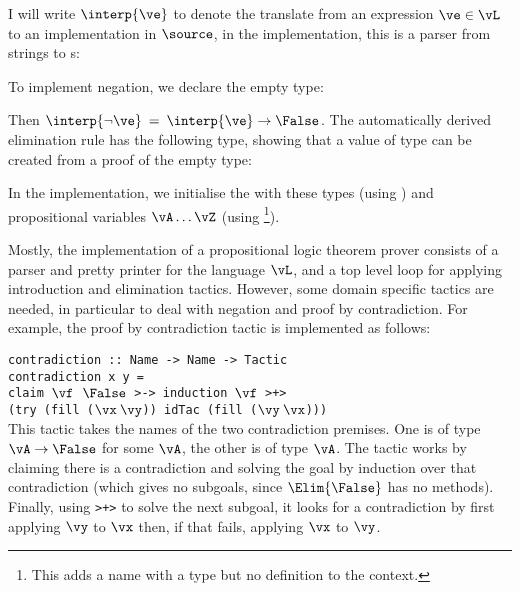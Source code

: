 I will write $\interp{\ve}$ to denote the translate from an expression
$\ve\in\vL$ to an implementation in $\source$, in the implementation,
this is a parser from strings to s:


To implement negation, we declare the empty type:

\DM{
\Data\:\False\Hab\Type\:=
}

Then $\interp{\neg\ve}\:=\:\interp{\ve}\to\False$. The automatically
derived elimination rule has the following type, showing that a value
of  type can be created from a proof of the empty type:

\DM{
\Elim{\False}\Hab\fbind{\vx}{\False}{
\fbind{\motive}{\False\to\Type}{\motive\:\vx}}
}

In the implementation, we initialise the  with these
types (using ) and propositional variables
$\vA\ldots\vZ$ (using \footnote{This adds a name with
  a type but no definition to the context.}).

Mostly, the implementation of a propositional logic theorem prover
consists of a parser and pretty printer for the language $\vL$, and a
top level loop for applying introduction and elimination
tactics. However, some domain
specific tactics are needed, in particular to deal with negation and
proof by contradiction. For example, the proof by contradiction tactic
is implemented as follows:

\texttt{contradiction :: Name -> Name -> Tactic}\\
\texttt{contradiction x y =}\\
\hspace*{0.5in}\texttt{claim $\vf$ $\False$ >-> induction $\vf$ >+>}\\
\hspace*{0.7in}\texttt{(try (fill ($\vx\:\vy$)) idTac (fill ($\vy\:\vx$)))}\\

This tactic takes the names of the two contradiction premises. One is
of type $\vA\to\False$ for some $\vA$, the other is of type
$\vA$. The tactic works by claiming there is a contradiction and
solving the goal by induction over that contradiction (which gives no
subgoals, since $\Elim{\False}$ has no methods). Finally, using
\texttt{>+>} to solve the next subgoal, it looks for a contradiction
by first applying $\vy$ to $\vx$ then, if that fails, applying $\vx$
to $\vy$.

